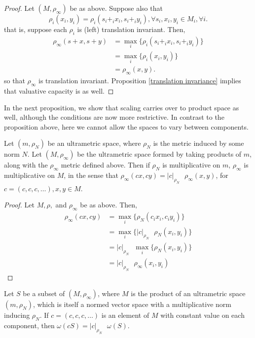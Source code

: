 \begin{proof}
Let $(M,\rho_\infty)$ be as above. Suppose also that \[\rho_i(x_i,y_i) = \rho_i(s_i +_i x_i, s_i +_iy_i), \forall s_i, x_i, y_i \in M_i, \forall i.\] that is, suppose each $\rho_i$ is (left) translation invariant. Then,  
\begin{align*}
\rho_\infty(s +x, s+y) &= \max_i\{\rho_i(s_i +_ix_i, s_i +_i y_i)\} \\
&= \max_i\{\rho_i(x_i, y_i)\}\\
&= \rho_\infty(x,y).
\end{align*} 
so that $\rho_\infty$ is translation invariant.  Proposition \ref{translation invariance} implies that valuative capacity is as well. 
\end{proof}

In the next proposition, we show that scaling carries over to product space as well, although the conditions are now more restrictive. In contrast to the proposition above, here  we cannot allow the spaces to vary between components.\\

\begin{proposition}
Let $(m, \rho_N)$ be an ultrametric space, where $\rho_N$ is the metric induced by some norm $N$. Let $(M, \rho_{\infty})$ be the ultrametric space formed by taking products of $m$, along with the $\rho_\infty$ metric defined above.  Then if $\rho_N$ is multiplicative on $m$, $\rho_{\infty}$ is multiplicative on $M$, in the sense that $\rho_{\infty}(cx,cy) = \lvert c\rvert_{\rho_N} \text{ } \rho_\infty (x,y)$, for $c=(c,c,c,\ldots), x,y \in M$.
\end{proposition}

\begin{proof}
Let $M, \rho,$ and $\rho_{\infty}$ be as above. Then, 
\begin{align*}
\rho_\infty(cx, cy) &= \max_i\{\rho_N(c_i x_i, c_i y_i)\} \\
&= \max_i\{\vert c \rvert_{\rho_N} \text{ }  \rho_N(x_i, y_i)\} \\
&= \vert c \rvert_{\rho_N} \text{ } \max_i\{\rho_N(x_i,y_i)\} \\
&= \vert c \rvert_{\rho_N} \text{ } \rho_\infty(x_i,y_i)
\end{align*}
\end{proof}

\begin{corollary}
Let $S$ be a subset of $(M, \rho_\infty)$, where $M$ is the product of an ultrametric space $(m, \rho_N)$, which is itself a normed vector space with a multiplicative norm inducing $\rho_N$. If $c=(c,c,c,\ldots)$ is an element of $M$ with constant value on each component, then $\omega(cS)=\lvert c \rvert_{\rho_N} \text{ }\omega(S)$.
\end{corollary}


